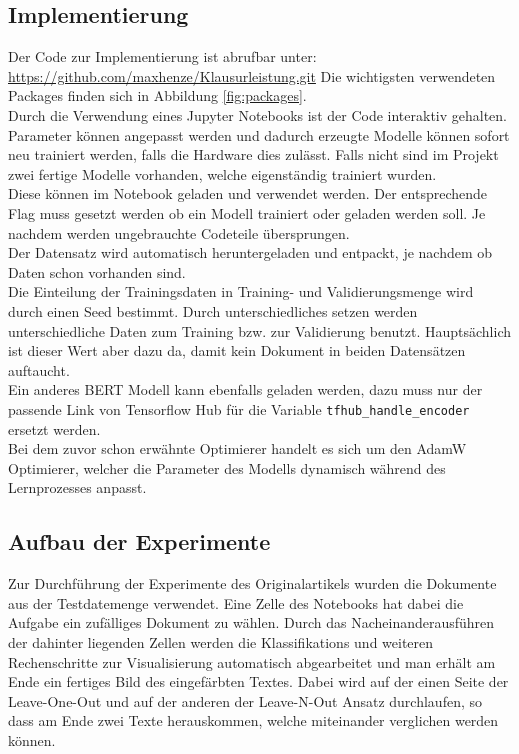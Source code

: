 \documentclass[DIV=13,fontsize=11pt]{scrartcl}
\begin{document}
\subsection{Implementierung}

Der Code zur Implementierung ist abrufbar unter: \url{https://github.com/maxhenze/Klausurleistung.git}
Die wichtigsten verwendeten Packages finden sich in Abbildung \ref{fig:packages}.\\

Durch die Verwendung eines Jupyter Notebooks ist der Code interaktiv gehalten.
Parameter können angepasst werden und dadurch erzeugte Modelle können sofort
neu trainiert werden, falls die Hardware dies zulässt. Falls nicht
sind im Projekt zwei fertige Modelle vorhanden, welche eigenständig trainiert wurden.\\

Diese können im Notebook geladen und verwendet werden. Der entsprechende
Flag muss gesetzt werden ob ein Modell trainiert oder geladen werden soll.
Je nachdem werden ungebrauchte Codeteile übersprungen.\\

Der Datensatz wird automatisch heruntergeladen und entpackt, je nachdem ob
Daten schon vorhanden sind.\\

Die Einteilung der Trainingsdaten in Training- und Validierungsmenge wird durch
einen Seed bestimmt. Durch unterschiedliches setzen werden unterschiedliche
Daten zum Training bzw. zur Validierung benutzt. Hauptsächlich ist dieser
Wert aber dazu da, damit kein Dokument in beiden Datensätzen auftaucht.\\

Ein anderes BERT Modell kann ebenfalls geladen werden, dazu muss nur der passende
Link von Tensorflow Hub für die Variable \texttt{tfhub\_handle\_encoder} ersetzt
werden.\\

Bei dem zuvor schon erwähnte Optimierer handelt es sich um den AdamW~\cite{DBLP:journals/corr/abs-1711-05101}
Optimierer, welcher die Parameter des Modells dynamisch während des Lernprozesses
anpasst.\\

\subsection{Aufbau der Experimente}

Zur Durchführung der Experimente des Originalartikels wurden die Dokumente
aus der Testdatemenge verwendet. Eine Zelle des Notebooks hat dabei die Aufgabe ein zufälliges
Dokument zu wählen. Durch das Nacheinanderausführen der dahinter liegenden
Zellen werden die Klassifikations und weiteren Rechenschritte zur Visualisierung
automatisch abgearbeitet und man erhält am Ende ein fertiges Bild des
eingefärbten Textes. Dabei wird auf der einen Seite der Leave-One-Out und auf der
anderen der Leave-N-Out Ansatz durchlaufen, so dass am Ende zwei Texte herauskommen,
welche miteinander verglichen werden können.
\end{document}
